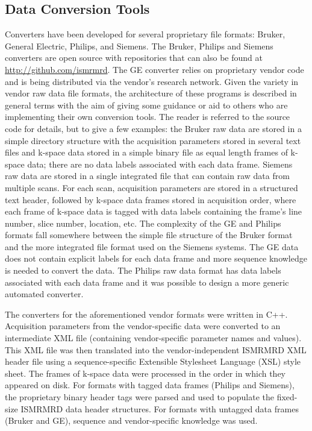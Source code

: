 \documentclass[12pt, draft]{article}
\begin{document}
\subsection*{Data Conversion Tools}
Converters have been developed for several proprietary file formats: Bruker, General Electric, Philips, and Siemens.  The Bruker, Philips and Siemens converters are open source with repositories that can also be found at \url{http://github.com/ismrmrd}.  The GE converter relies on proprietary vendor code and is being distributed via the vendor's research network.  Given the variety in vendor raw data file formats, the architecture of these programs is described in general terms with the aim of giving some guidance or aid to others who are implementing their own conversion tools.  The reader is referred to the source code for  details, but to give a few examples: the Bruker raw data are stored in a simple directory structure with the acquisition parameters stored in several text files and k-space data stored in a simple binary file as equal length frames of k-space data; there are no data labels associated with each data frame. Siemens raw data are stored in a single integrated file that can contain raw data from multiple scans.  For each scan, acquisition parameters are stored in a structured text header, followed by k-space data frames stored in acquisition order, where each frame of k-space data is tagged with data labels containing the frame's line number, slice number, location, etc. The complexity of the GE and Philips formats fall somewhere between the simple file structure of the Bruker format and the more integrated file format used on the Siemens systems. The GE data does not contain explicit labels for each data frame and more sequence knowledge is needed to convert the data. The Philips raw data format has data labels associated with each data frame and it was possible to design a more generic automated converter.   

The converters for the aforementioned vendor formats were written in C++. Acquisition parameters from the vendor-specific data were converted to an intermediate XML file (containing vendor-specific parameter names and values). This  XML file was then translated into the vendor-independent ISMRMRD XML header file using a sequence-specific Extensible Stylesheet Language (XSL) style sheet. The frames of k-space data were processed in the order in which they appeared on disk.  For formats with tagged data frames (Philips and Siemens), the proprietary binary header tags were parsed and used to populate the fixed-size ISMRMRD data header structures.  For formats with untagged data frames (Bruker and GE), sequence and vendor-specific knowledge was used.  
\end{document}
